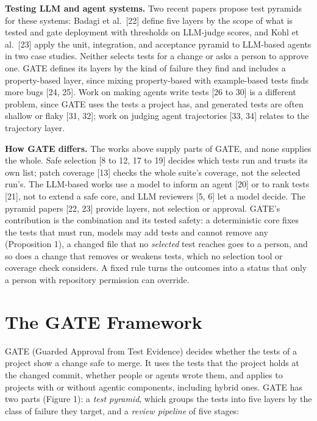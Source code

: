 \documentclass[conference]{IEEEtran}
\begin{document}
\textbf{Testing LLM and agent systems.} Two recent papers propose test pyramids for these systems: Badagi et al.~{[}22{]} define five layers by the scope of what is tested and gate deployment with thresholds on LLM-judge scores, and Kohl et al.~{[}23{]} apply the unit, integration, and acceptance pyramid to LLM-based agents in two case studies. Neither selects tests for a change or asks a person to approve one. GATE defines its layers by the kind of failure they find and includes a property-based layer, since mixing property-based with example-based tests finds more bugs {[}24, 25{]}. Work on making agents write tests {[}26 to 30{]} is a different problem, since GATE uses the tests a project has, and generated tests are often shallow or flaky {[}31, 32{]}; work on judging agent trajectories {[}33, 34{]} relates to the trajectory layer.

\textbf{How GATE differs.} The works above supply parts of GATE, and none supplies the whole. Safe selection {[}8 to 12, 17 to 19{]} decides which tests run and trusts its own list; patch coverage {[}13{]} checks the whole suite's coverage, not the selected run's. The LLM-based works use a model to inform an agent {[}20{]} or to rank tests {[}21{]}, not to extend a safe core, and LLM reviewers {[}5, 6{]} let a model decide. The pyramid papers {[}22, 23{]} provide layers, not selection or approval. GATE's contribution is the combination and its tested safety: a deterministic core fixes the tests that must run, models may add tests and cannot remove any (Proposition 1), a changed file that no \emph{selected} test reaches goes to a person, and so does a change that removes or weakens tests, which no selection tool or coverage check considers. A fixed rule turns the outcomes into a status that only a person with repository permission can override.

\section{The GATE Framework}\label{the-gate-framework}

GATE (Guarded Approval from Test Evidence) decides whether the tests of a project show a change safe to merge. It uses the tests that the project holds at the changed commit, whether people or agents wrote them, and applies to projects with or without agentic components, including hybrid ones. GATE has two parts (Figure 1): a \emph{test pyramid}, which groups the tests into five layers by the class of failure they target, and a \emph{review pipeline} of five stages:
\end{document}
